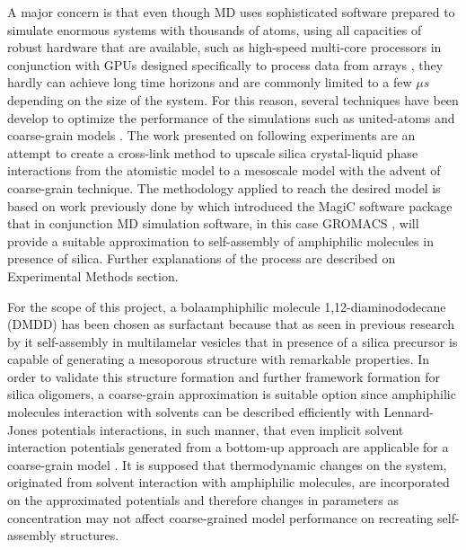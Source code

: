 \documentclass[10pt,a4paper,twoside]{article}
\begin{document}
A major concern is that even though MD uses sophisticated software prepared to simulate enormous systems with thousands of atoms, using all capacities of robust hardware that are available, such as high-speed multi-core processors in conjunction with GPUs designed specifically to process data from arrays \cite{gromacs}, they hardly can achieve long time horizons and are commonly limited to a few $\mu s$ depending on the size of the system. For this reason, several techniques have been develop to optimize the performance of the simulations such as united-atoms and coarse-grain models \cite{someone}. The work presented on following experiments are an attempt to create a cross-link method to upscale silica crystal-liquid phase interactions \cite{silica1} from the atomistic model to a mesoscale model with the advent of coarse-grain technique. The methodology applied to reach the desired model is based on work previously done by  which introduced the MagiC software package \cite{magic} that in conjunction MD simulation software, in this case GROMACS \cite{gromacs}, will provide a suitable approximation to self-assembly of amphiphilic molecules in presence of silica. Further explanations of the process are described on Experimental Methods section.

For the scope of this project, a bolaamphiphilic molecule 1,12-diaminododecane (DMDD) has been chosen as surfactant because that as seen in previous research by  it self-assembly in multilamelar vesicles that in presence of a silica precursor is capable of generating a mesoporous structure with remarkable properties. In order to validate this structure formation and further framework formation for silica oligomers, a coarse-grain approximation is suitable option since amphiphilic molecules interaction with solvents can be described efficiently with Lennard-Jones potentials interactions, in such manner, that even implicit solvent interaction potentials generated from a bottom-up approach are applicable for a coarse-grain model \cite{dmpc}. It is supposed  that thermodynamic changes on the system, originated from solvent interaction with amphiphilic molecules, are incorporated on the approximated potentials and therefore changes in parameters as concentration may not affect coarse-grained model performance on recreating self-assembly structures. 
\end{document}
